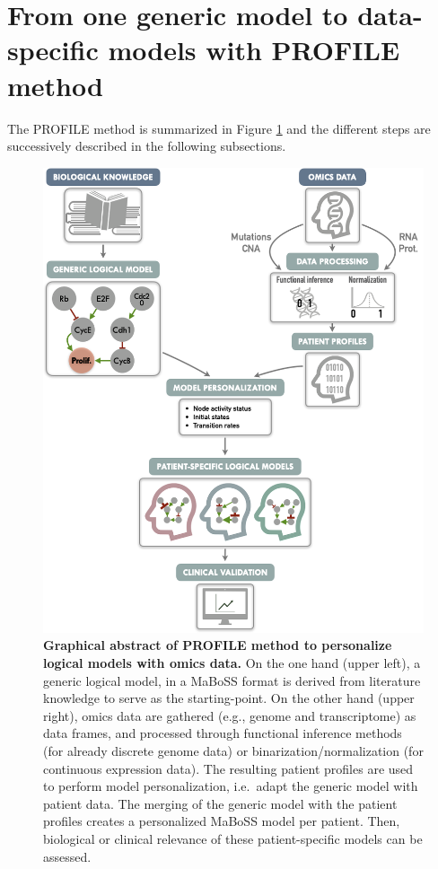 \documentclass[a4paper,12pt,twoside,onecolumn,openright,final,oldfontcommands]{memoir}
\begin{document}
\section{From one generic model to data-specific models with PROFILE
method}\label{from-one-generic-model-to-data-specific-models-with-profile-method}

The PROFILE method is summarized in Figure \ref{fig:PROFILE-abstract}
and the different steps are successively described in the following
subsections.

\begin{figure}

{\centering \includegraphics[width=0.8\linewidth]{fig/PROFILE-abstract} 

}

\caption[Graphical abstract of PROFILE method to personalize logical models with omics data]{\textbf{Graphical abstract of PROFILE
method to personalize logical models with omics data.} On the one hand
(upper left), a generic logical model, in a MaBoSS format is derived
from literature knowledge to serve as the starting-point. On the other
hand (upper right), omics data are gathered (e.g., genome and
transcriptome) as data frames, and processed through functional
inference methods (for already discrete genome data) or
binarization/normalization (for continuous expression data). The
resulting patient profiles are used to perform model personalization,
i.e.~adapt the generic model with patient data. The merging of the
generic model with the patient profiles creates a personalized MaBoSS
model per patient. Then, biological or clinical relevance of these
patient-specific models can be assessed.}\label{fig:PROFILE-abstract}
\end{figure}
\end{document}
